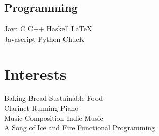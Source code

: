 \documentclass[letterpaper]{deedy-resume} %
\begin{document}
\begin{minipage}[t]{0.33\textwidth}
\subsection{Programming}
Java \textbullet{} C \textbullet{} C++ \textbullet{} Haskell \textbullet{} \LaTeX  \\
Javascript \textbullet{} Python \textbullet{} ChucK \\




\sectionspace %

\section{Interests}
Baking Bread \textbullet{} Sustainable Food \\
Clarinet \textbullet{} Running{} \textbullet{} Piano \\
Music Composition \textbullet{} Indie Music \\
A Song of Ice and Fire \textbullet{} Functional Programming


\end{minipage} %
\hfill
%
\end{document}
